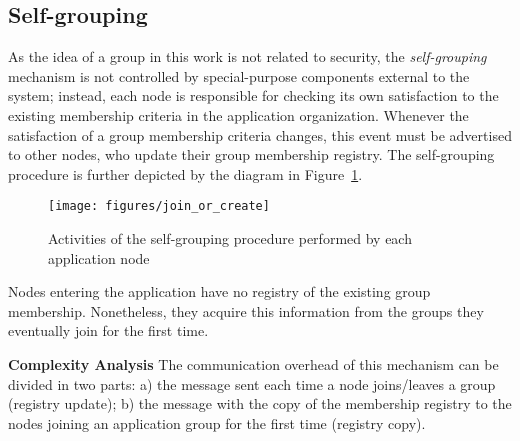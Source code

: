 \subsection{Self-grouping} 




As the idea of a group in this work is not related to security, the \textit{self-grouping} mechanism is not controlled by special-purpose components external to the system; instead, each node is responsible for checking its own satisfaction to the existing membership criteria in the application organization. Whenever the satisfaction of a group membership criteria changes, this event must be  advertised to other nodes, who update their group membership registry. 
The self-grouping procedure is further depicted by the diagram in Figure~\ref{fig:self_grouping}.
 
\begin{figure}[t!]
	\centering
	\texttt{[image: figures/join\_or\_create]}
	\caption{Activities of the self-grouping procedure performed by each application node}
	\label{fig:self_grouping}
\end{figure} 
 

Nodes entering the application have no registry of the existing group membership. Nonetheless, they acquire this information from the groups they eventually join for the first time. 

\textbf{Complexity Analysis} The communication overhead of this mechanism can be divided in two parts: a) the message sent each time a node joins/leaves a group (registry update); b) the message with the copy of the membership registry to the nodes joining an application group for the first time (registry copy). 

